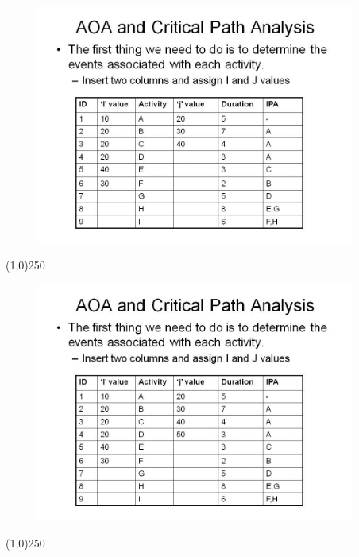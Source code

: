\begin{frame}
\begin{figure}
	\centering
		\includegraphics[width = 10.5cm]{oldnotes/Slide68.jpg}
\end{figure}
\end{frame}
\begin{center}\line(1,0){250}\end{center}


\begin{frame}
\begin{figure}
	\centering
		\includegraphics[width = 10.5cm]{oldnotes/Slide69.jpg}
\end{figure}
\end{frame}
\begin{center}\line(1,0){250}\end{center}


